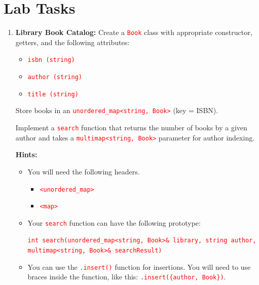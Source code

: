 \documentclass[12pt]{article}
\begin{document}
\newpage
{}
\part*{\centering Lab Tasks}

\begin{enumerate}

    \item \textbf{Library Book Catalog:} Create a \textcolor{red}{\texttt{Book}} class with appropriate constructor, getters, and the following attributes:

    \begin{itemize}
        \item \textcolor{red}{\texttt{isbn (string)}}
        \item \textcolor{red}{\texttt{author (string)}}
        \item \textcolor{red}{\texttt{title (string)}}
    \end{itemize}

    Store books in an \textcolor{red}{\texttt{unordered\_map<string, Book>}} (key = ISBN).

    Implement a \textcolor{red}{\texttt{search}} function that returns the number of books by a given author and takes a \textcolor{red}{\texttt{multimap<string, Book>}} parameter for 
    author indexing.

    \textbf{Hints:}

    \begin{itemize}
        \item You will need the following headers.
        
        \begin{itemize}
            \item \textcolor{red}{\texttt{<unordered\_map>}}
            \item \textcolor{red}{\texttt{<map>}}
        \end{itemize}

        \item Your \textcolor{red}{\texttt{search}} function can have the following prototype: 
        
        \textcolor{red}{\texttt{int search(unordered\_map<string, Book>\& library, string author, multimap<string, Book>\& searchResult)}}

        \item You can use the \textcolor{red}{\texttt{.insert()}} function for insertions. You will need to use braces inside the function, like this: 
        \textcolor{red}{\texttt{.insert(\{author, Book\})}}.


\end{itemize}
\end{enumerate}
\end{document}
